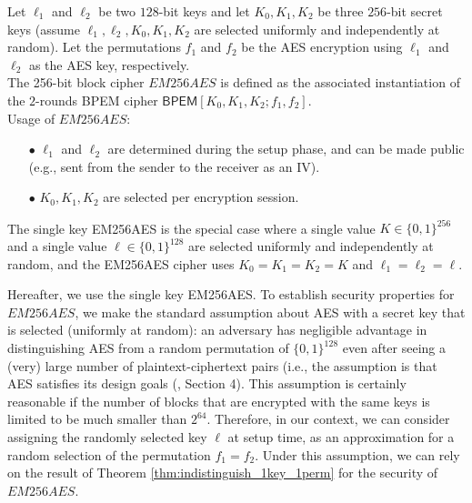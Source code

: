 \documentclass{llncs}
\newcommand{\tx}{\textsf}
\begin{document}
\begin{definition}
Let $\ell_1$ and $\ell_2$ be two $128$-bit keys and let $K_0, K_1, K_2$ be three $256$-bit secret keys (assume $\ell_1,\ell_2,K_0,K_1,K_2$ are selected uniformly and independently at random). Let the permutations $f_1$ and $f_2$ be the AES encryption using $\ell_1$ and $\ell_2$ as the AES key, respectively. \\
The 256-bit block cipher $EM256AES$ is defined as the associated instantiation of the $2$-rounds BPEM cipher $\tx{BPEM}[K_0,K_1, K_2;f_1, f_2] $. \\
Usage of $EM256AES$:

\begin{itemize}
\item [$\bullet$]
$\ell_1$ and $\ell_2$ are determined during the setup phase, and can be made public (e.g., sent from the sender to the receiver as an IV).
\item [$\bullet$]
$K_0, K_1, K_2$ are selected per encryption session.
\end{itemize}
The single key EM256AES is the special case where a single value $K \in \{0, 1 \}^{256}$ and a single value $\ell \in \{0, 1 \}^{128}$ are selected uniformly and independently at random, and the EM256AES cipher uses $K_0=K_1=K_2 = K$ and $\ell_1=\ell_2 = \ell$.
\end{definition}

Hereafter, we use the single key EM256AES. To establish security properties for $EM256AES$, we make the standard assumption about AES with a secret key that is selected (uniformly at random): an adversary has negligible advantage in distinguishing AES from a random permutation of $\{0, 1\}^{128}$ even after seeing a (very) large number of plaintext-ciphertext pairs (i.e., the assumption is that AES satisfies its design goals (\cite{NIST_request}, Section 4).
This assumption is certainly reasonable if the number of blocks that are encrypted with the same keys is limited to be much smaller than $2^{64}$.
Therefore, in our context, we can consider assigning the randomly selected key $\ell$ at setup time, as an approximation for a random selection of the permutation $f_1 = f_2$.
Under this assumption, we can rely on the result of Theorem \ref{thm:indistinguish_1key_1perm} for the security of $EM256AES$.
\end{document}
